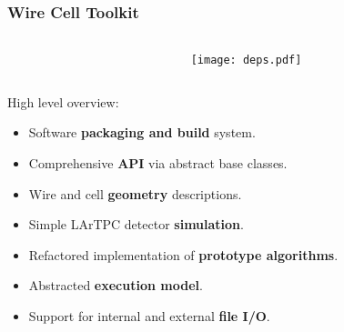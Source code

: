\documentclass[xcolor=dvipsnames]{beamer}
\begin{document}
\begin{frame}
  \frametitle{Wire Cell Toolkit}
      
  \begin{columns}
    \begin{column}{0.6\paperwidth}
    \end{column}
    \begin{column}{0.4\paperwidth}
      \vspace{-20mm}
      \texttt{[image: deps.pdf]}      
    \end{column}
  \end{columns}

  \vspace{-10mm}

  High level overview:
  \begin{itemize}
  \item Software \textbf{packaging and build} system.
  \item Comprehensive \textbf{API} via abstract base classes.
  \item Wire and cell \textbf{geometry} descriptions.
  \item Simple LArTPC detector \textbf{simulation}.
  \item Refactored implementation of \textbf{prototype algorithms}.
  \item Abstracted \textbf{execution model}.
  \item Support for internal and external \textbf{file I/O}.
  \end{itemize}

\end{frame}
\end{document}

